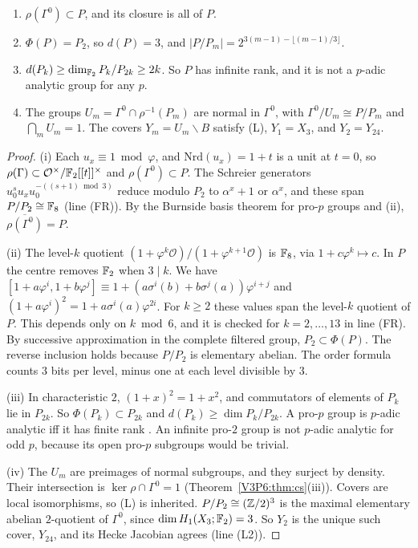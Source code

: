 \begin{theorem}\label{V3P6:thm:tower}
\begin{enumerate}
\item[(i)] $\rho(\Gamma^{0})\subset P$, and its closure is all of $P$.
\item[(ii)] $\Phi(P)=P_2$, so $d(P)=3$, and $|P/P_m|=2^{3(m-1)-\lfloor(m-1)/3\rfloor}$.
\item[(iii)] $d(P_k)\ge\dim_{\mathbb{F}_2}P_k/P_{2k}\ge2k$. So $P$ has infinite rank, and it is not a
$p$-adic analytic group for any $p$.
\item[(iv)] The groups $U_m=\Gamma^{0}\cap\rho^{-1}(P_m)$ are normal in $\Gamma^{0}$, with
$\Gamma^{0}/U_m\cong P/P_m$ and $\bigcap_mU_m=1$. The covers $Y_m=U_m\backslash B$ satisfy
\textup{(L)}, $Y_1=X_3$, and $Y_2=Y_{24}$.
\end{enumerate}
\end{theorem}

\begin{proof}
(i) Each $u_x\equiv1\bmod\varphi$, and $\mathrm{Nrd}(u_x)=1+t$ is a unit at $t=0$, so
$\rho(\Gamma)\subset\mathcal O^{\times}/\mathbb{F}_2[[t]]^{\times}$ and $\rho(\Gamma^{0})\subset P$. The
Schreier generators $u_0^{s}u_xu_0^{-((s+1)\bmod3)}$ reduce modulo $P_2$ to
$\alpha^{x}+1$ or $\alpha^{x}$, and these span $P/P_2\cong\mathbb{F}_8$ (line (FR)). By the Burnside basis
theorem for pro-$p$ groups and (ii), $\overline{\rho(\Gamma^{0})}=P$.

(ii) The level-$k$ quotient $(1+\varphi^{k}\mathcal O)/(1+\varphi^{k+1}\mathcal O)$ is $\mathbb{F}_8$, via
$1+c\varphi^{k}\mapsto c$. In $P$ the centre removes $\mathbb{F}_2$ when $3\mid k$. We have
$[1+a\varphi^{i},1+b\varphi^{j}]\equiv1+(a\sigma^{i}(b)+b\sigma^{j}(a))\varphi^{i+j}$ and
$(1+a\varphi^{i})^{2}=1+a\sigma^{i}(a)\varphi^{2i}$. For $k\ge2$ these values span the level-$k$
quotient of $P$. This depends only on $k\bmod 6$, and it is checked for $k=2,\dots,13$ in line (FR).
By successive approximation in the complete filtered group, $P_2\subset\Phi(P)$. The reverse
inclusion holds because $P/P_2$ is elementary abelian. The order formula counts $3$ bits per
level, minus one at each level divisible by $3$.

(iii) In characteristic $2$, $(1+x)^{2}=1+x^{2}$, and commutators of elements of $P_k$ lie in
$P_{2k}$. So $\Phi(P_k)\subset P_{2k}$ and $d(P_k)\ge\dim P_k/P_{2k}$. A pro-$p$ group is
$p$-adic analytic iff it has finite rank \cite{DDMS}. An infinite pro-$2$ group is not
$p$-adic analytic for odd $p$, because its open pro-$p$ subgroups would be trivial.

(iv) The $U_m$ are preimages of normal subgroups, and they surject by density. Their
intersection is $\ker\rho\cap\Gamma^{0}=1$ (Theorem~\ref{V3P6:thm:cs}(iii)). Covers are local
isomorphisms, so (L) is inherited. $P/P_2\cong(\mathbb{Z}/2)^{3}$ is the maximal elementary abelian
$2$-quotient of $\Gamma^{0}$, since $\dim H_1(X_3;\mathbb{F}_2)=3$. So $Y_2$ is the unique such cover,
$Y_{24}$, and its Hecke Jacobian agrees (line (L2)).
\end{proof}

